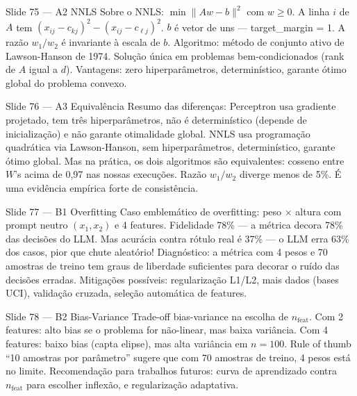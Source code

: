 \documentclass[aspectratio=169,10pt]{beamer}
\begin{document}
\begin{frame}{Slide 75 --- A2 NNLS}
\footnotesize
Sobre o NNLS: $\min \|Aw - b\|^2$ com $w \geq 0$. A linha $i$ de $A$ tem $(x_{ij} - c_{kj})^2 - (x_{ij} - c_{\ell j})^2$. $b$ \'e vetor de uns --- target\_margin = 1. A raz\~ao $w_1/w_2$ \'e invariante \`a escala de $b$. Algoritmo: m\'etodo de conjunto ativo de Lawson-Hanson de 1974. Solu\c{c}\~ao \'unica em problemas bem-condicionados (rank de $A$ igual a $d$). Vantagens: zero hiperpar\^ametros, determin\'istico, garante \'otimo global do problema convexo.
\end{frame}

\begin{frame}{Slide 76 --- A3 Equival\^encia}
\footnotesize
Resumo das diferen\c{c}as: Perceptron usa gradiente projetado, tem tr\^es hiperpar\^ametros, n\~ao \'e determin\'istico (depende de inicializa\c{c}\~ao) e n\~ao garante otimalidade global. NNLS usa programa\c{c}\~ao quadr\'atica via Lawson-Hanson, sem hiperpar\^ametros, determin\'istico, garante \'otimo global. Mas na pr\'atica, os dois algoritmos s\~ao equivalentes: cosseno entre $W$'s acima de 0,97 nas nossas execu\c{c}\~oes. Raz\~ao $w_1/w_2$ diverge menos de 5\%. \'E uma evid\^encia emp\'irica forte de consist\^encia.
\end{frame}

\begin{frame}{Slide 77 --- B1 Overfitting}
\footnotesize
Caso emblem\'atico de overfitting: peso $\times$ altura com prompt neutro $(x_1, x_2)$ e 4 features. Fidelidade 78\% --- a m\'etrica decora 78\% das decis\~oes do LLM. Mas acur\'acia contra r\'otulo real \'e 37\% --- o LLM erra 63\% dos casos, pior que chute aleat\'orio! Diagn\'ostico: a m\'etrica com 4 pesos e 70 amostras de treino tem graus de liberdade suficientes para decorar o ru\'ido das decis\~oes erradas. Mitiga\c{c}\~oes poss\'iveis: regulariza\c{c}\~ao L1/L2, mais dados (bases UCI), valida\c{c}\~ao cruzada, sele\c{c}\~ao autom\'atica de features.
\end{frame}

\begin{frame}{Slide 78 --- B2 Bias-Variance}
\footnotesize
Trade-off bias-variance na escolha de $n_{\text{feat}}$. Com 2 features: alto bias se o problema for n\~ao-linear, mas baixa vari\^ancia. Com 4 features: baixo bias (capta elipse), mas alta vari\^ancia em $n=100$. Rule of thumb ``10 amostras por par\^ametro'' sugere que com 70 amostras de treino, 4 pesos est\'a no limite. Recomenda\c{c}\~ao para trabalhos futuros: curva de aprendizado contra $n_{\text{feat}}$ para escolher inflex\~ao, e regulariza\c{c}\~ao adaptativa.
\end{frame}
\end{document}
